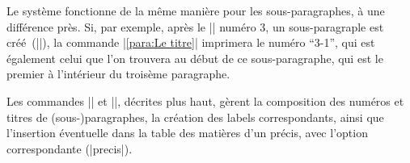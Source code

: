 Le système fonctionne de la même manière pour les sous-paragraphes, à une différence près. Si, par exemple, après le |\para| numéro 3, un sous-paragraple est créé~(|\subpara[Le titre]|), la commande |\ref{para:Le titre}| imprimera le numéro \enquote{3-1}, qui est également celui que l'on trouvera au début de ce sous-paragraphe, qui est le premier à l'intérieur du troisème paragraphe.

\begin{developer}
Les commandes |\para| et |\subpara|, décrites plus haut, gèrent la composition des numéros et titres de (sous-)paragraphes, la création des labels correspondants, ainsi que l'insertion éventuelle dans la table des matières d'un précis, avec l'option correspondante (|precis|).
\end{developer}

\begin{noprint}
\newcommand{\para}[1][]{%
	\refstepcounter{para}%
	\paraskip%
	{\paranumcolour\paranumstyle{\thepara\paranumsep}%
	 \if\relax#1\relax\label{para:\thepara}\else\label{para:#1}\fi}%
	\if@paraname
		\if\relax#1\relax\else%
			\if@marginalia%
				\marginpar{\paracolour\paratitlestyle{#1}}%
			\else%
				{\paracolour\paratitlestyle{#1\parasep}}%
	\fi\fi\fi%
	\if\relax#1\relax\else
		\refstepcounter{precis}
		\addtocontents{toc}{%
			\protect\if@precis%
				\ifnum\value{precis}>1\cftprecissep\else\cftbeforeprecis\fi%
				{\cftprecisstyle{\cftprecisnumstyle\thepara\cftprecisaftersnum}%
				#1\cftprecisnumsep\cftprecisleader\thepage\cftprecisafterpnum}%
			\protect\fi%
			\protect\@ifnextchar\protect\contentsline{\protect\cftafterprecis}{}%
			}%
	\fi
	\@ifnextchar\par{\@gobblepar\relax}{\relax}}
\end{noprint}

